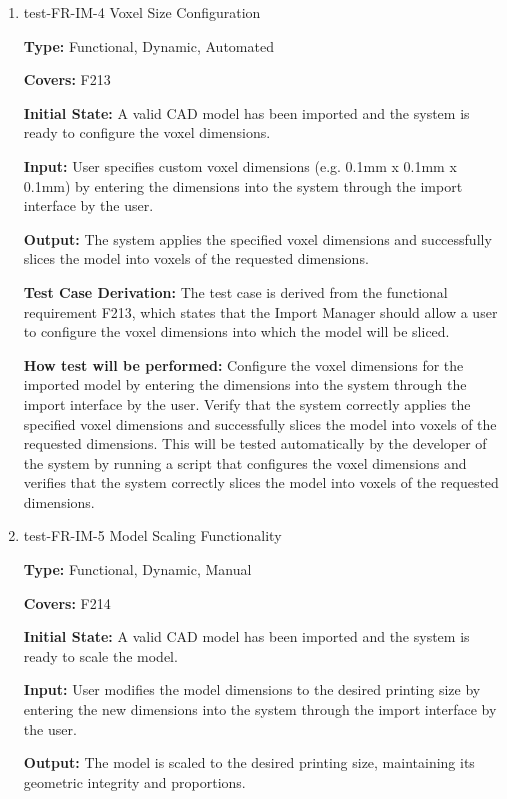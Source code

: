 \documentclass[12pt, titlepage]{article}
\begin{document}
\begin{enumerate}

\item{test-FR-IM-4 Voxel Size Configuration\\}
\label{sec:t-im-4}

\textbf{Type:} Functional, Dynamic, Automated

\textbf{Covers:} F213
					
\textbf{Initial State:} A valid CAD model has been imported and the system is ready to configure the voxel dimensions.
					
\textbf{Input:} User specifies custom voxel dimensions (e.g. 0.1mm x 0.1mm x 0.1mm) by entering the dimensions into the system through the import interface by the user.
					
\textbf{Output:} The system applies the specified voxel dimensions and successfully slices the model into voxels of the requested dimensions.

\textbf{Test Case Derivation:} The test case is derived from the functional requirement F213, which states that the Import Manager should allow a user to configure the voxel dimensions into which the model will be sliced.
					
\textbf{How test will be performed:} Configure the voxel dimensions for the imported model by entering the dimensions into the system through the import interface by the user. Verify that the system correctly applies the specified voxel dimensions and successfully slices the model into voxels of the requested dimensions. This will be tested automatically by the developer of the system by running a script that configures the voxel dimensions and verifies that the system correctly slices the model into voxels of the requested dimensions.

\item{test-FR-IM-5 Model Scaling Functionality\\}
\label{sec:t-im-5}

\textbf{Type:} Functional, Dynamic, Manual

\textbf{Covers:} F214
					
\textbf{Initial State:} A valid CAD model has been imported and the system is ready to scale the model.
					
\textbf{Input:} User modifies the model dimensions to the desired printing size by entering the new dimensions into the system through the import interface by the user.
					
\textbf{Output:} The model is scaled to the desired printing size, maintaining its geometric integrity and proportions.


\end{enumerate}
\end{document}
